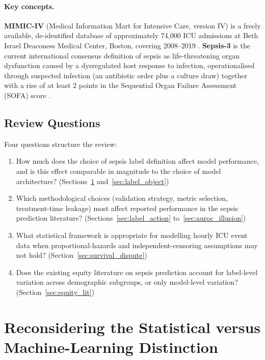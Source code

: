 \paragraph{Key concepts.} \textbf{MIMIC-IV} (Medical Information Mart for
Intensive Care, version IV) is a freely available, de-identified database of
approximately 74,000 ICU admissions at Beth Israel Deaconess Medical Center,
Boston, covering 2008--2019 \cite{johnson2023mimiciv}. \textbf{Sepsis-3} is the
current international consensus definition of sepsis as life-threatening organ
dysfunction caused by a dysregulated host response to infection, operationalised
through suspected infection (an antibiotic order plus a culture draw) together
with a rise of at least 2 points in the Sequential Organ Failure Assessment
(SOFA) score \cite{singer2016sepsis3}.

\subsection*{Review Questions}

Four questions structure the review:

\begin{enumerate}
    \item[\textbf{RQ1.}] How much does the choice of sepsis label definition
    affect model performance, and is this effect comparable in magnitude to
    the choice of model architecture? (Sections~\ref{sec:false_dichotomy}
    and~\ref{sec:label_object})
    \item[\textbf{RQ2.}] Which methodological choices (validation strategy,
    metric selection, treatment-time leakage) most affect reported performance
    in the sepsis prediction literature? (Sections~\ref{sec:label_action}
    to~\ref{sec:auroc_illusion})
    \item[\textbf{RQ3.}] What statistical framework is appropriate for
    modelling hourly ICU event data when proportional-hazards and
    independent-censoring assumptions may not hold?
    (Section~\ref{sec:survival_dispute})
    \item[\textbf{RQ4.}] Does the existing equity literature on sepsis
    prediction account for label-level variation across demographic subgroups,
    or only model-level variation? (Section~\ref{sec:equity_lit})
\end{enumerate}


\section{Reconsidering the Statistical versus Machine-Learning Distinction}
\label{sec:false_dichotomy}

